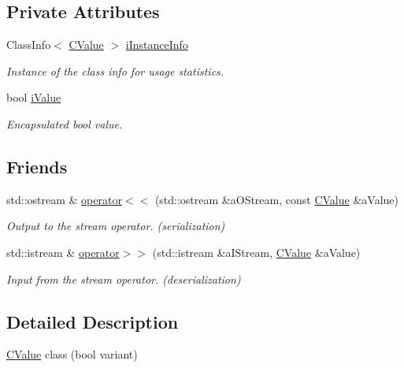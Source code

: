 \subsection*{Private Attributes}
\begin{DoxyCompactItemize}
\item 
Class\+Info$<$ \hyperlink{class_c_value__bool_1_1_c_value}{C\+Value} $>$ \hyperlink{class_c_value__bool_1_1_c_value_a5e9470a5efc80373b5cc943f25d1a803}{i\+Instance\+Info}
\begin{DoxyCompactList}\small\item\em Instance of the class info for usage statistics. \end{DoxyCompactList}\item 
bool \hyperlink{class_c_value__bool_1_1_c_value_a2a05b9efee1e0497a631a39b0146b776}{i\+Value}
\begin{DoxyCompactList}\small\item\em Encapsulated {\ttfamily bool} value. \end{DoxyCompactList}\end{DoxyCompactItemize}
\subsection*{Friends}
\begin{DoxyCompactItemize}
\item 
std\+::ostream \& \hyperlink{class_c_value__bool_1_1_c_value_a3d28097fae6bdd5a8146d9ab90f8b62f}{operator$<$$<$} (std\+::ostream \&a\+O\+Stream, const \hyperlink{class_c_value__bool_1_1_c_value}{C\+Value} \&a\+Value)
\begin{DoxyCompactList}\small\item\em Output to the stream operator. ({\itshape serialization}) \end{DoxyCompactList}\item 
std\+::istream \& \hyperlink{class_c_value__bool_1_1_c_value_aba05045ca890e398c1211784aebbc9ed}{operator$>$$>$} (std\+::istream \&a\+I\+Stream, \hyperlink{class_c_value__bool_1_1_c_value}{C\+Value} \&a\+Value)
\begin{DoxyCompactList}\small\item\em Input from the stream operator. ({\itshape deserialization}) \end{DoxyCompactList}\end{DoxyCompactItemize}


\subsection{Detailed Description}
\hyperlink{class_c_value__bool_1_1_c_value}{C\+Value} class ({\ttfamily bool} variant) 

